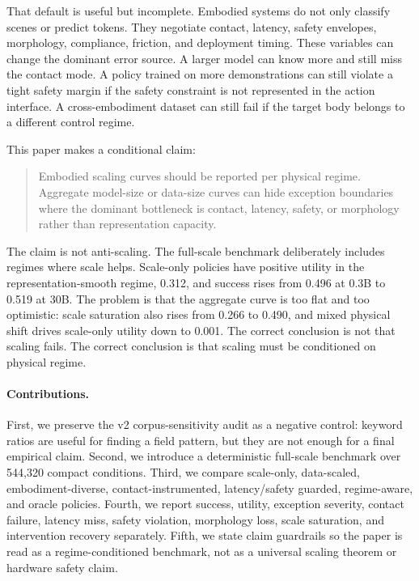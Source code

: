 \documentclass{article}
\begin{document}
That default is useful but incomplete. Embodied systems do not only classify scenes or predict tokens. They negotiate contact, latency, safety envelopes, morphology, compliance, friction, and deployment timing. These variables can change the dominant error source. A larger model can know more and still miss the contact mode. A policy trained on more demonstrations can still violate a tight safety margin if the safety constraint is not represented in the action interface. A cross-embodiment dataset can still fail if the target body belongs to a different control regime.

This paper makes a conditional claim:

\begin{quote}
Embodied scaling curves should be reported per physical regime. Aggregate model-size or data-size curves can hide exception boundaries where the dominant bottleneck is contact, latency, safety, or morphology rather than representation capacity.
\end{quote}

The claim is not anti-scaling. The full-scale benchmark deliberately includes regimes where scale helps. Scale-only policies have positive utility in the representation-smooth regime, 0.312, and success rises from 0.496 at 0.3B to 0.519 at 30B. The problem is that the aggregate curve is too flat and too optimistic: scale saturation also rises from 0.266 to 0.490, and mixed physical shift drives scale-only utility down to 0.001. The correct conclusion is not that scaling fails. The correct conclusion is that scaling must be conditioned on physical regime.

\paragraph{Contributions.}
First, we preserve the v2 corpus-sensitivity audit as a negative control: keyword ratios are useful for finding a field pattern, but they are not enough for a final empirical claim. Second, we introduce a deterministic full-scale benchmark over 544,320 compact conditions. Third, we compare scale-only, data-scaled, embodiment-diverse, contact-instrumented, latency/safety guarded, regime-aware, and oracle policies. Fourth, we report success, utility, exception severity, contact failure, latency miss, safety violation, morphology loss, scale saturation, and intervention recovery separately. Fifth, we state claim guardrails so the paper is read as a regime-conditioned benchmark, not as a universal scaling theorem or hardware safety claim.
\end{document}
